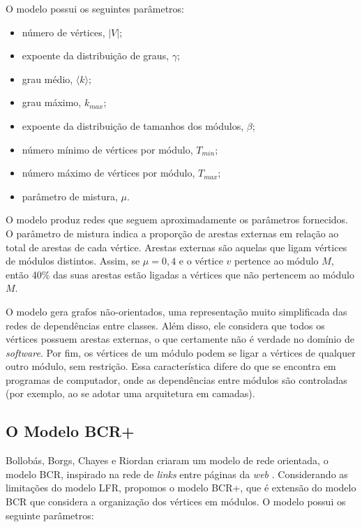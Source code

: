 \documentclass{acm_proc_article-sp}
\begin{document}
O modelo possui os seguintes parâmetros:
\begin{itemize}
  \item número de vértices, $|V|$;
  \item expoente da distribuição de graus, $\gamma$;
  \item grau médio, $\langle k \rangle$;
  \item grau máximo, $k_{max}$;
  \item expoente da distribuição de tamanhos dos módulos, $\beta$;
  \item número mínimo de vértices por módulo, $T_{min}$;
  \item número máximo de vértices por módulo, $T_{max}$;
  \item parâmetro de mistura, $\mu$.
\end{itemize}

O modelo produz redes que seguem aproximadamente os parâmetros fornecidos. O parâmetro de mistura indica a proporção de arestas externas em relação ao total de arestas de cada vértice. Arestas externas são aquelas que ligam vértices de módulos distintos. Assim, se $\mu = 0,4$ e o vértice $v$ pertence ao módulo $M$, então 40\% das suas arestas estão ligadas a vértices que não pertencem ao módulo $M$.


  O modelo gera grafos não-orientados, uma representação muito simplificada das redes de dependências entre classes. Além disso, ele considera que todos os vértices possuem arestas externas, o que certamente não é verdade no domínio de \emph{software}. Por fim, os vértices de um módulo podem se ligar a vértices de qualquer outro módulo, sem restrição. Essa característica difere do que se encontra em programas de computador, onde as dependências entre módulos são controladas (por exemplo, ao se adotar uma arquitetura em camadas).

\subsection{O Modelo BCR+}

Bollobás, Borgs, Chayes e Riordan criaram um modelo de rede orientada, o modelo BCR, inspirado na rede de \emph{links} entre páginas da \emph{web} \cite{Bollobas2003}. Considerando as limitações do modelo LFR, propomos o modelo BCR+, que é extensão do modelo BCR que considera a organização dos vértices em módulos. O modelo possui os seguinte parâmetros:
\end{document}
